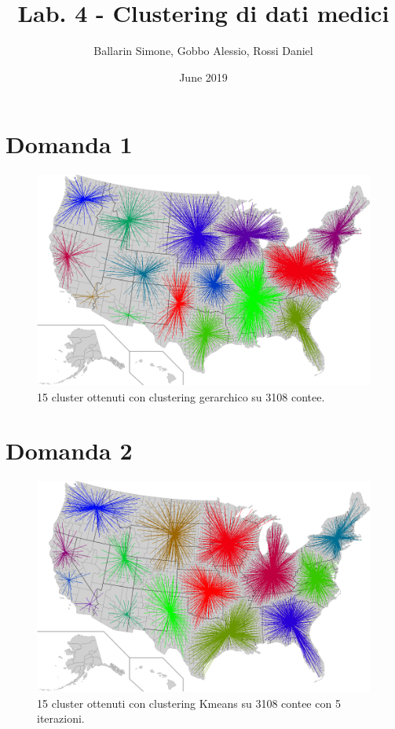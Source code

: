 \documentclass{article}
\title{Lab. 4 - Clustering di dati medici}
\author{Ballarin Simone, Gobbo Alessio, Rossi Daniel}
\date{June 2019}
\begin{document}
\maketitle

\section*{Domanda 1}
\begin{center}
	\begin{figure}[H]
		\hspace*{1.5cm}\includegraphics[width=0.8\linewidth, valign=t]{figures/Domanda1}
		\caption*{15 cluster ottenuti con clustering gerarchico su 3108 contee.}
	\end{figure}
\end{center}

\section*{Domanda 2}
\begin{center}
	\begin{figure}[H]
		\hspace*{1.5cm}\includegraphics[width=0.8\linewidth, valign=t]{figures/Domanda2}
		\caption*{15 cluster ottenuti con clustering Kmeans su 3108 contee con 5 iterazioni.}
				
	\end{figure}
\end{center}
\end{document}
